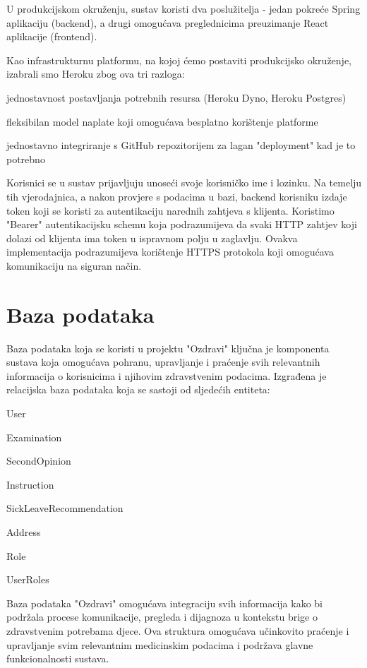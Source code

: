 		U produkcijskom okruženju, sustav koristi dva poslužitelja - jedan pokreće Spring aplikaciju (backend), a drugi omogućava preglednicima preuzimanje React aplikacije (frontend).

		Kao infrastrukturnu platformu, na kojoj ćemo postaviti produkcijsko okruženje, izabrali smo Heroku zbog ova tri razloga:
		\begin{packed_item}
			\item jednostavnost postavljanja potrebnih resursa (Heroku Dyno, Heroku Postgres)
			\item fleksibilan model naplate koji omogućava besplatno korištenje platforme
			\item jednostavno integriranje s GitHub repozitorijem za lagan "deployment" kad je to potrebno
		\end{packed_item}

		Korisnici se u sustav prijavljuju unoseći svoje korisničko ime i lozinku. Na temelju tih vjerodajnica, a nakon provjere s podacima u bazi, backend korisniku izdaje token koji se koristi za autentikaciju narednih zahtjeva s klijenta.
		Koristimo "Bearer" autentikacijsku schemu koja podrazumijeva da svaki HTTP zahtjev koji dolazi od klijenta ima token u ispravnom polju u zaglavlju. Ovakva implementacija podrazumijeva korištenje HTTPS protokola koji omogućava komunikaciju na siguran način.
					
		\section{Baza podataka}
        Baza podataka koja se koristi u projektu "Ozdravi" ključna je komponenta sustava koja omogućava pohranu, upravljanje i praćenje svih relevantnih informacija o korisnicima i njihovim zdravstvenim podacima. 
		Izgrađena je relacijska baza podataka koja se sastoji od sljedećih entiteta:
		\begin{packed_item}
			\item User
			\item Examination
			\item SecondOpinion
			\item Instruction
			\item SickLeaveRecommendation
			\item Address
			\item Role
			\item UserRoles
		\end{packed_item}

        Baza podataka "Ozdravi" omogućava integraciju svih informacija kako bi podržala procese komunikacije, pregleda i dijagnoza u kontekstu brige o zdravstvenim potrebama djece. Ova struktura omogućava učinkovito praćenje i upravljanje svim 
		relevantnim medicinskim podacima i podržava glavne funkcionalnosti sustava.
        
